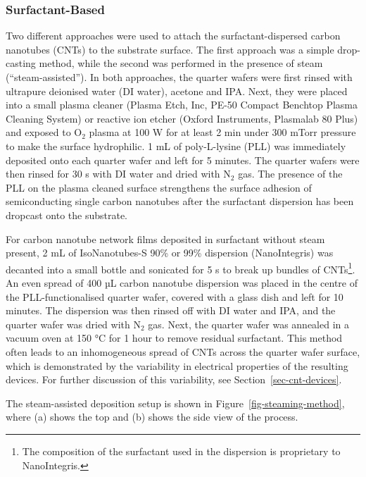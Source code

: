 \documentclass[
  a4paper,
]{scrbook}
\begin{document}
\hypertarget{surfactant-based}{%
\subsubsection*{Surfactant-Based}\label{surfactant-based}}

Two different approaches were used to attach the surfactant-dispersed
carbon nanotubes (CNTs) to the substrate surface. The first approach was
a simple drop-casting method, while the second was performed in the
presence of steam (``steam-assisted''). In both approaches, the quarter
wafers were first rinsed with ultrapure deionised water (DI water),
acetone and IPA. Next, they were placed into a small plasma cleaner
(Plasma Etch, Inc, PE-50 Compact Benchtop Plasma Cleaning System) or
reactive ion etcher (Oxford Instruments, Plasmalab 80 Plus) and exposed
to O\(_2\) plasma at 100 W for at least 2 min under 300 mTorr pressure
to make the surface hydrophilic. 1 mL of poly-L-lysine (PLL) was
immediately deposited onto each quarter wafer and left for 5 minutes.
The quarter wafers were then rinsed for 30 s with DI water and dried
with N\(_2\) gas. The presence of the PLL on the plasma cleaned surface
strengthens the surface adhesion of semiconducting single carbon
nanotubes after the surfactant dispersion has been dropcast onto the
substrate.

For carbon nanotube network films deposited in surfactant without steam
present, 2 mL of IsoNanotubes-S 90\% or 99\% dispersion (NanoIntegris)
was decanted into a small bottle and sonicated for 5 s to break up
bundles of CNTs\footnote{The composition of the surfactant used in the
  dispersion is proprietary to NanoIntegris.}. An even spread of 400 µL
carbon nanotube dispersion was placed in the centre of the
PLL-functionalised quarter wafer, covered with a glass dish and left for
10 minutes. The dispersion was then rinsed off with DI water and IPA,
and the quarter wafer was dried with N\(_2\) gas. Next, the quarter
wafer was annealed in a vacuum oven at 150 °C for 1 hour to remove
residual surfactant. This method often leads to an inhomogeneous spread
of CNTs across the quarter wafer surface, which is demonstrated by the
variability in electrical properties of the resulting devices. For
further discussion of this variability, see
Section~\ref{sec-cnt-devices}.

The steam-assisted deposition setup is shown in
Figure~\ref{fig-steaming-method}, where (a) shows the top and (b) shows
the side view of the process.
\end{document}
